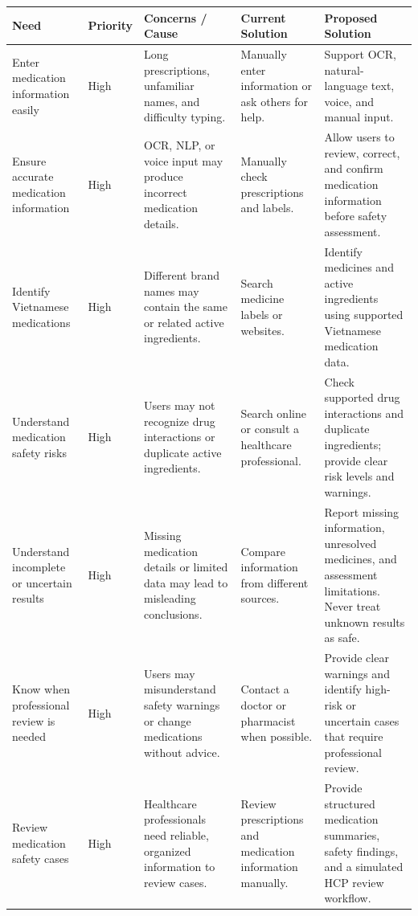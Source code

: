 \begin{longtable}{|L{0.21\textwidth}|L{0.09\textwidth}|L{0.20\textwidth}|L{0.20\textwidth}|L{0.20\textwidth}|}
\hline
\textbf{Need} &
\textbf{Priority} &
\textbf{Concerns / Cause} &
\textbf{Current Solution} &
\textbf{Proposed Solution}\\ \hline

Enter medication information easily
& High
& Long prescriptions, unfamiliar names,
and difficulty typing.
& Manually enter information or ask others for help.
& Support OCR, natural-language text,
voice, and manual input.
\\ \hline

Ensure accurate medication information
& High
& OCR, NLP, or voice input may produce
incorrect medication details.
& Manually check prescriptions and labels.
& Allow users to review, correct,
and confirm medication information
before safety assessment.
\\ \hline

Identify Vietnamese medications
& High
& Different brand names may contain
the same or related active ingredients.
& Search medicine labels or websites.
& Identify medicines and active ingredients
using supported Vietnamese medication data.
\\ \hline

Understand medication safety risks
& High
& Users may not recognize drug interactions
or duplicate active ingredients.
& Search online or consult a healthcare professional.
& Check supported drug interactions and
duplicate ingredients; provide clear
risk levels and warnings.
\\ \hline

Understand incomplete or uncertain results
& High
& Missing medication details or limited data
may lead to misleading conclusions.
& Compare information from different sources.
& Report missing information, unresolved
medicines, and assessment limitations.
Never treat unknown results as safe.
\\ \hline

Know when professional review is needed
& High
& Users may misunderstand safety warnings
or change medications without advice.
& Contact a doctor or pharmacist when possible.
& Provide clear warnings and identify
high-risk or uncertain cases that
require professional review.
\\ \hline

Review medication safety cases
& High
& Healthcare professionals need reliable,
organized information to review cases.
& Review prescriptions and medication
information manually.
& Provide structured medication summaries,
safety findings, and a simulated
HCP review workflow.
\\ \hline


\end{longtable}
